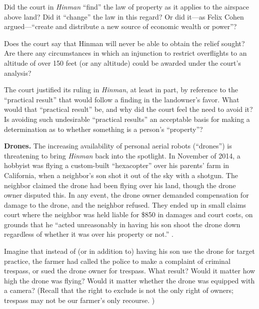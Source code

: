
\item Did the court in \textit{Hinman} ``find'' the law of property as it
applies to the airspace above land? Did it ``change'' the law in this regard?
Or did it---as Felix Cohen argued---``create and distribute a new source of
economic wealth or power''?

\item Does the court say that Hinman will never be able to obtain the relief
sought? Are there any circumstances in which an injunction to restrict
overflights to an altitude of over 150 feet (or any altitude) could be awarded
under the court's analysis?

\item The court justified its ruling in \textit{Hinman}, at least in part, by
reference to the ``practical result'' that would follow a finding in the
landowner's favor. What would that ``practical result'' be, and why did the
court feel the need to avoid it? Is avoiding such undesirable ``practical
results'' an acceptable basis for making a determination as to whether
something is a person's ``property''?


\item \textbf{Drones.} The increasing availability of personal aerial robots
(``drones'') is threatening to bring \textit{Hinman} back into the spotlight.
In November of 2014, a hobbyist was flying a custom-built ``hexacopter'' over
his parents' farm in California, when a neighbor's son shot it out of the sky
with a shotgun. The neighbor claimed the drone had been flying over his land,
though the drone owner disputed this. In any event, the drone owner demanded
compensation for damage to the drone, and the neighbor refused. They ended up
in small claims court where the neighbor was held liable for \$850 in damages
and court costs, on grounds that he ``acted unreasonably in having his son
shoot the drone down regardless of whether it was over his property or not.''
.

Imagine that instead of (or in addition to) having his son use the drone for
target practice, the farmer had called the police to make a complaint of
criminal trespass, or sued the drone owner for trespass. What result? Would it
matter how high the drone was flying? Would it matter whether the drone was
equipped with a camera? (Recall that the right to exclude is not the only right
of owners; trespass may not be our farmer's only recourse.
)

